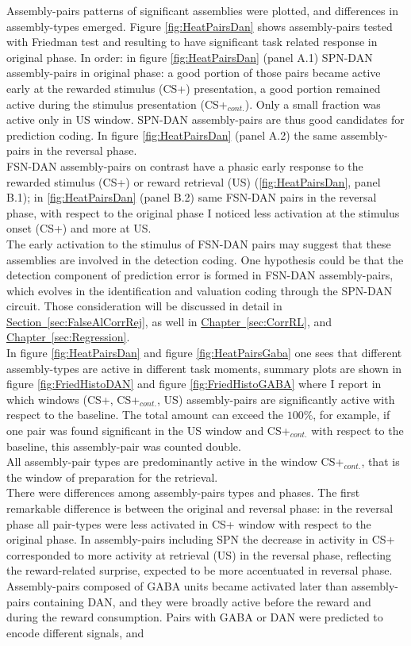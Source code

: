 Assembly-pairs patterns of significant assemblies were plotted, and differences in assembly-types emerged. Figure \ref{fig:HeatPairsDan} shows assembly-pairs tested with Friedman test and resulting to have significant task related response in original phase. In order: in figure \ref{fig:HeatPairsDan} (panel A.1) SPN-DAN assembly-pairs in original phase: a good portion of those pairs became active early at the rewarded stimulus (CS+) presentation, a good portion remained active during the stimulus presentation (CS+$_{cont.}$). Only a small fraction was active only in US window. SPN-DAN assembly-pairs are thus good candidates for prediction coding. In figure \ref{fig:HeatPairsDan} (panel A.2) the same assembly-pairs in the reversal phase.\\FSN-DAN assembly-pairs on contrast have a phasic early response to the rewarded stimulus (CS+) or reward retrieval (US) (\ref{fig:HeatPairsDan}, panel B.1); in \ref{fig:HeatPairsDan} (panel B.2) same FSN-DAN pairs in the reversal phase, with respect to the original phase I noticed less activation at the stimulus onset (CS+) and more at US.\\The early activation to the stimulus of FSN-DAN pairs may suggest that these assemblies are involved in the detection coding. One hypothesis could be that the detection component of prediction error is formed in FSN-DAN assembly-pairs, which evolves in the identification and valuation coding through the SPN-DAN circuit. Those consideration will be discussed in detail in \hyperref[sec:FalseAlCorrRej]{Section~\ref*{sec:FalseAlCorrRej}}, as well in \hyperref[sec:CorrRL]{Chapter~\ref*{sec:CorrRL}}, and \hyperref[sec:Regression]{Chapter~\ref*{sec:Regression}}.\\In figure \ref{fig:HeatPairsDan} and figure \ref{fig:HeatPairsGaba} one sees that different assembly-types are active in different task moments, summary plots are shown in figure \ref{fig:FriedHistoDAN} and figure \ref{fig:FriedHistoGABA} where I report in which windows (CS+, CS+$_{cont.}$, US) assembly-pairs are significantly active with respect to the baseline. The total amount can exceed the $100\%$, for example, if one pair was found significant in the US window and CS+$_{cont.}$ with respect to the baseline, this assembly-pair was counted double.\\All assembly-pair types are predominantly active in the window CS+$_{cont.}$, that is the window of preparation for the retrieval.\\There were differences among assembly-pairs types and phases. The first remarkable difference is between the original and reversal phase: in the reversal phase all pair-types were less activated in CS+ window with respect to the original phase. In assembly-pairs including SPN the decrease in activity in CS+ corresponded to more activity at retrieval (US) in the reversal phase, reflecting the reward-related surprise, expected to be more accentuated in reversal phase. Assembly-pairs composed of GABA units became activated later than assembly-pairs containing DAN, and they were broadly active before the reward and during the reward consumption. Pairs with GABA or DAN were predicted to encode different signals, and 